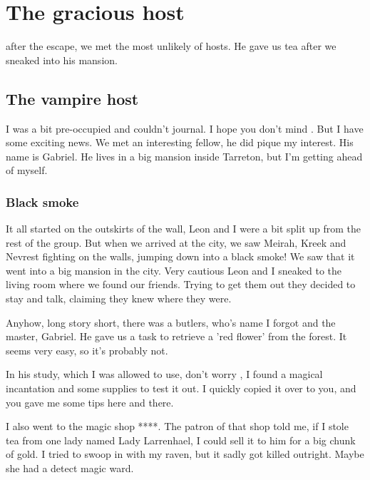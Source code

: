 \chapter{The gracious host}
\label{diary__gabriel}

 after the escape, we met the most unlikely of hosts. He gave us tea after we sneaked into his mansion.

\section{The vampire host}

I was a bit pre-occupied and couldn't journal. I hope you don't mind \Master{}. But I have some exciting news. We met an interesting fellow, he did pique my interest. His name is Gabriel. He lives in a big mansion inside Tarreton, but I'm getting ahead of myself.

\subsection*{Black smoke}

It all started on the outskirts of the wall, Leon and I were a bit split up from the rest of the group. But when we arrived at the city, we saw Meirah, Kreek and Nevrest fighting on the walls, jumping down into a black smoke! We saw that it went into a big mansion in the city. Very cautious Leon and I sneaked to the living room where we found our friends. Trying to get them out they decided to stay and talk, claiming they knew where they were.

Anyhow, long story short, there was a butlers, who's name I forgot and the master, Gabriel. He gave us a task to retrieve a 'red flower' from the forest. It seems very easy, so it's probably not.

In his study, which I was allowed to use, don't worry \Master{}, I found a magical incantation and some supplies to test it out. I quickly copied it over to you, and you gave me some tips here and there.

I also went to the magic shop ****. The patron of that shop told me, if I stole tea from one lady named Lady Larrenhael, I could sell it to him for a big chunk of gold. I tried to swoop in with my raven, but it sadly got killed outright. Maybe she had a detect magic ward.

